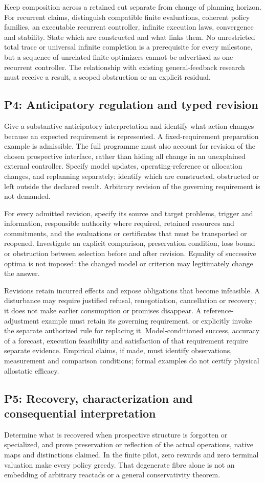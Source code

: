 \documentclass[11pt]{article}
\newcommand{\obligation}[2]{\subsection*{#1: #2}\hypertarget{#1}{}}
\begin{document}
Keep composition across a retained cut separate from change of planning horizon. For recurrent claims, distinguish compatible finite evaluations, coherent policy families, an executable recurrent controller, infinite execution laws, convergence and stability. State which are constructed and what links them. No unrestricted total trace or universal infinite completion is a prerequisite for every milestone, but a sequence of unrelated finite optimizers cannot be advertised as one recurrent controller. The relationship with existing general-feedback research must receive a result, a scoped obstruction or an explicit residual.

\obligation{P4}{Anticipatory regulation and typed revision}
Give a substantive anticipatory interpretation and identify what action changes because an expected requirement is represented. A fixed-requirement preparation example is admissible. The full programme must also account for revision of the chosen prospective interface, rather than hiding all change in an unexplained external controller. Specify model updates, operating-reference or allocation changes, and replanning separately; identify which are constructed, obstructed or left outside the declared result. Arbitrary revision of the governing requirement is not demanded.

For every admitted revision, specify its source and target problems, trigger and information, responsible authority where required, retained resources and commitments, and the evaluations or certificates that must be transported or reopened. Investigate an explicit comparison, preservation condition, loss bound or obstruction between selection before and after revision. Equality of successive optima is not imposed: the changed model or criterion may legitimately change the answer.

Revisions retain incurred effects and expose obligations that become infeasible. A disturbance may require justified refusal, renegotiation, cancellation or recovery; it does not make earlier consumption or promises disappear. A reference-adjustment example must retain its governing requirement, or explicitly invoke the separate authorized rule for replacing it. Model-conditioned success, accuracy of a forecast, execution feasibility and satisfaction of that requirement require separate evidence. Empirical claims, if made, must identify observations, measurement and comparison conditions; formal examples do not certify physical allostatic efficacy.

\obligation{P5}{Recovery, characterization and consequential interpretation}
Determine what is recovered when prospective structure is forgotten or specialized, and prove preservation or reflection of the actual operations, native maps and distinctions claimed. In the finite pilot, zero rewards and zero terminal valuation make every policy greedy. That degenerate fibre alone is not an embedding of arbitrary reactads or a general conservativity theorem.
\end{document}
